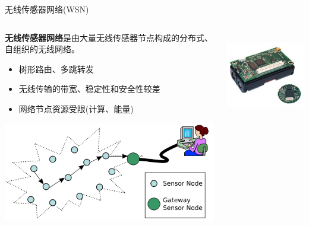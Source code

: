 \documentclass[mathserif,compress,CJKutf8, red]{beamer}
\newcommand{\wuhao}{\fontsize{10.5pt}{\baselineskip}\selectfont}    %
\newcommand{\liuhao}{\fontsize{7.875pt}{\baselineskip}\selectfont}  %
\begin{document}
\begin{CJK*}{UTF8}{song}
\begin{frame}{无线传感器网络(WSN)}
\begin{columns}
  \begin{column}{0.7\textwidth}
   \textbf{无线传感器网络}是由大量无线传感器节点构成的分布式、自组织的无线网络。
   \wuhao \begin{itemize}
    \item 树形路由、多跳转发
    \item 无线传输的带宽、稳定性和安全性较差
    \item 网络节点资源受限(计算、能量)
    \end{itemize}
   \includegraphics[width=\textwidth]{images/wsn.png}
  \end{column}
  \begin{column}{0.3\textwidth}
   \centering \liuhao{mica2, mica2dot(伯克利)}\\
   \includegraphics[width=.9\textwidth]{images/mica_family.jpg}\\
   \liuhao{FLOWS3(清华)}\\

\end{column}
\end{columns}
\end{frame}
\end{CJK*}
\end{document}
